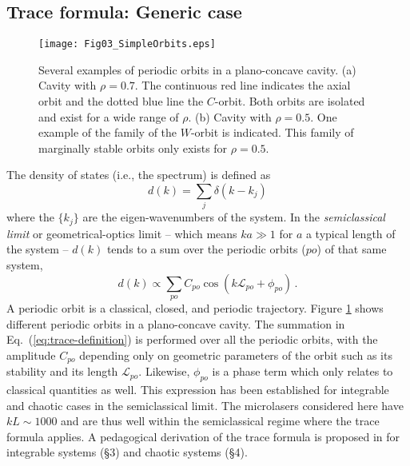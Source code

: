 \documentclass[10pt]{iopart}
\begin{document}
\subsection{Trace formula: Generic case} \label{sec:trace-generique}

\begin{figure}[tb]
\begin{center}
\texttt{[image: Fig03\_SimpleOrbits.eps]}
\end{center}
\caption{Several examples of periodic orbits in a plano-concave cavity. (a) Cavity with $\rho = 0.7$. The continuous red line indicates the axial orbit and the dotted blue line the $C$-orbit. Both orbits are isolated and exist for a wide range of $\rho$. (b) Cavity with $\rho = 0.5$. One example of the family of the $W$-orbit is indicated. This family of marginally stable orbits only exists for $\rho = 0.5$.}
\label{fig:differentes-orbites}
\end{figure}

The density of states (i.e., the spectrum) is defined as
\begin{equation} d(k) = \sum_j \delta(k - k_j) \end{equation}
where the $\{k_j\}$ are the eigen-wavenumbers of the system. In the \emph{semiclassical limit} or geometrical-optics limit -- which means $ka \gg 1$ for $a$ a typical length of the system -- $d(k)$ tends to a sum over the periodic orbits ($po$) of that same system,
\begin{equation} \label{eq:trace-definition}
d(k) \propto \sum_{po} C_{po} \cos(k\mathcal{L}_{po} + \phi_{po}) \, .
\end{equation}
A periodic orbit is a classical, closed, and periodic trajectory. Figure \ref{fig:differentes-orbites} shows different periodic orbits in a plano-concave cavity. The summation in Eq.~(\ref{eq:trace-definition}) is performed over all the periodic orbits, with the amplitude $C_{po}$ depending only on geometric parameters of the orbit such as its stability and its length $\mathcal{L}_{po}$. Likewise, $\phi_{po}$ is a phase term which only relates to classical quantities as well. This expression has been established for integrable \cite{balian} and chaotic \cite{gutzwiller} cases in the semiclassical limit. The microlasers considered here have $kL \sim 1000$ and are thus well within the semiclassical regime where the trace formula applies. A pedagogical derivation of the trace formula is proposed in \cite{bogomolny-2003} for integrable systems (\S 3) and chaotic systems (\S 4). %
\end{document}
